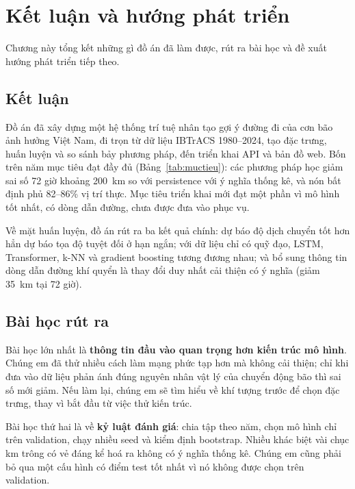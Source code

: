 \chapter{Kết luận và hướng phát triển}
\label{ch:ketluan}

\begin{muctieu}
Chương này tổng kết những gì đồ án đã làm được, rút ra bài học và đề xuất
hướng phát triển tiếp theo.
\end{muctieu}

\section{Kết luận}

Đồ án đã xây dựng một hệ thống trí tuệ nhân tạo gợi ý đường đi của cơn bão
ảnh hưởng Việt Nam, đi trọn từ dữ liệu IBTrACS 1980--2024, tạo đặc trưng,
huấn luyện và so sánh bảy phương pháp, đến triển khai API và bản đồ web. Bốn
trên năm mục tiêu đạt đầy đủ (Bảng~\ref{tab:muctieu}): các phương pháp học giảm
sai số 72 giờ khoảng 200~km so với persistence với ý nghĩa thống kê, và nón bất
định phủ 82--86\% vị trí thực. Mục tiêu triển khai mới đạt một phần vì mô hình
tốt nhất, có dòng dẫn đường, chưa được đưa vào phục vụ.

Về mặt huấn luyện, đồ án rút ra ba kết quả chính: dự báo độ dịch chuyển tốt hơn
hẳn dự báo tọa độ tuyệt đối ở hạn ngắn; với dữ liệu chỉ có quỹ đạo, LSTM,
Transformer, k-NN và gradient boosting tương đương nhau; và bổ sung thông tin
dòng dẫn đường khí quyển là thay đổi duy nhất cải thiện có ý nghĩa (giảm 35~km
tại 72 giờ).

\section{Bài học rút ra}

Bài học lớn nhất là \textbf{thông tin đầu vào quan trọng hơn kiến trúc mô hình}.
Chúng em đã thử nhiều cách làm mạng phức tạp hơn mà không cải thiện; chỉ khi
đưa vào dữ liệu phản ánh đúng nguyên nhân vật lý của chuyển động bão thì sai số
mới giảm. Nếu làm lại, chúng em sẽ tìm hiểu về khí tượng trước để chọn đặc trưng, thay vì
bắt đầu từ việc thử kiến trúc.

Bài học thứ hai là về \textbf{kỷ luật đánh giá}: chia tập theo năm, chọn mô hình
chỉ trên validation, chạy nhiều seed và kiểm định bootstrap. Nhiều khác biệt vài
chục km trông có vẻ đáng kể hoá ra không có ý nghĩa thống kê. Chúng em cũng phải
bỏ qua một cấu hình có điểm test tốt nhất vì nó không được chọn trên validation.

